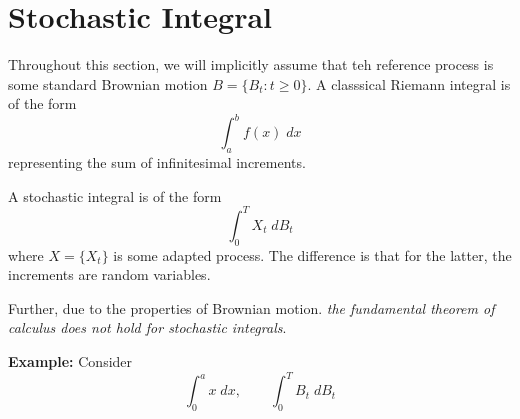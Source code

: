 \documentclass[12pt]{report}
\newcommand*{\tbf}[1]{\ifmmode\mathbf{#1}\else\textbf{#1}\fi}
\begin{document}
\section{Stochastic Integral}
    Throughout this section, we will implicitly assume that teh reference process is some standard Brownian motion $B = \{B_t: t \geq 0\}$. A classsical Riemann integral is of the form 
    \[\int_a^bf(x) \; dx\]
    representing the sum of infinitesimal increments. 
    
    A stochastic integral is of the form 
    \[\int_0^{T} X_t \; dB_t\]
    where $X = \{X_t\}$ is some adapted process. The difference is that for the latter, the increments are random variables. 

    Further, due to the properties of Brownian motion. \emph{the fundamental theorem of calculus does not hold for stochastic integrals}.

    \tbf{Example:} Consider 
    \[\int_0^a x\; dx, \qquad \int_0^T B_t \; dB_t\]
\end{document}
